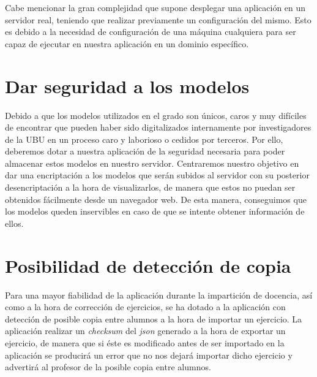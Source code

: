 Cabe mencionar la gran complejidad que supone desplegar una aplicación en un servidor real, teniendo que realizar previamente un configuración del mismo. Esto es debido a la necesidad de configuración de una máquina cualquiera para ser capaz de ejecutar en nuestra aplicación en un dominio específico.

\section{Dar seguridad a los modelos}
Debido a que los modelos utilizados en el grado son únicos, caros y muy difíciles de encontrar que pueden haber sido digitalizados internamente por investigadores de la UBU en un proceso caro y laborioso o cedidos por terceros. Por ello, deberemos dotar a nuestra aplicación de la seguridad necesaria para poder almacenar estos modelos en nuestro servidor. Centraremos nuestro objetivo en dar una encriptación a los modelos que serán subidos al servidor con su posterior desencriptación a la hora de visualizarlos, de manera que estos no puedan ser obtenidos fácilmente desde un navegador web. De esta manera, conseguimos que los modelos queden inservibles en caso de que se intente obtener información de ellos.

\section{Posibilidad de detección de copia}
Para una mayor fiabilidad de la aplicación durante la impartición de docencia, así como a la hora de corrección de ejercicios, se ha dotado a la aplicación con detección de posible copia entre alumnos a la hora de importar un ejercicio. La aplicación realizar un \textit{checksum} del \textit{json} generado a la hora de exportar un ejercicio, de manera que si éste es modificado antes de ser importado en la aplicación se producirá un error que no nos dejará importar dicho ejercicio y advertirá al profesor de la posible copia entre alumnos.
